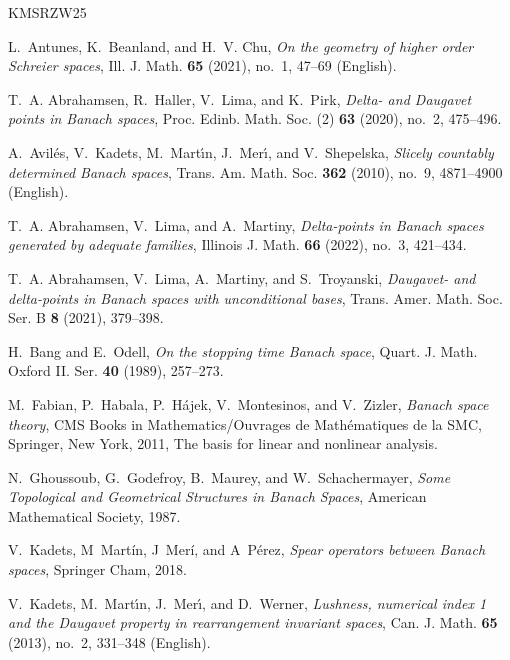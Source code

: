 \documentclass[11pt,a4paper,reqno]{amsart}
\numberwithin{equation}{section}
\newcommand{\1}{\mathbbm{1}}
\theoremstyle{plain}
\theoremstyle{definition}
\begin{document}
\begin{thebibliography}{KMSRZW25}

L.~Antunes, K.~Beanland, and H.~V. Chu, \emph{On the geometry of higher order {Schreier} spaces}, Ill. J. Math. \textbf{65} (2021), no.~1, 47--69 (English).

T.~A. Abrahamsen, R.~Haller, V.~Lima, and K.~Pirk, \emph{Delta- and {D}augavet points in {B}anach spaces}, Proc. Edinb. Math. Soc. (2) \textbf{63} (2020), no.~2, 475--496. 

A.~Avil{\'e}s, V.~Kadets, M.~Mart{\'{\i}}n, J.~Mer{\'{\i}}, and V.~Shepelska, \emph{Slicely countably determined {Banach} spaces}, Trans. Am. Math. Soc. \textbf{362} (2010), no.~9, 4871--4900 (English).

T.~A. Abrahamsen, V.~Lima, and A.~Martiny, \emph{Delta-points in {B}anach spaces generated by adequate families}, Illinois J. Math. \textbf{66} (2022), no.~3, 421--434. 

T.~A. Abrahamsen, V.~Lima, A.~Martiny, and S.~Troyanski, \emph{Daugavet- and delta-points in {B}anach spaces with unconditional bases}, Trans. Amer. Math. Soc. Ser. B \textbf{8} (2021), 379--398. 

H.~Bang and E.~Odell, \emph{{O}n the stopping time {Banach} space}, Quart. J. Math. Oxford II. Ser. \textbf{40} (1989), 257--273.

M.~Fabian, P.~Habala, P.~H{\'a}jek, V.~Montesinos, and V.~Zizler, \emph{Banach space theory}, CMS Books in Mathematics/Ouvrages de Math\'ematiques de la SMC, Springer, New York, 2011, The basis for linear and nonlinear analysis. 

N.~Ghoussoub, G.~Godefroy, B.~Maurey, and W.~Schachermayer, \emph{{S}ome {T}opological and {G}eometrical {S}tructures in {B}anach {S}paces}, {A}merican {M}athematical {S}ociety, 1987.

V.~Kadets, M~Mart\'{i}n, J~Mer\'{i}, and A~P\'{e}rez, \emph{Spear operators between {B}anach spaces}, Springer Cham, 2018.

V.~{Kadets}, M.~{Mart\'{\i}n}, J.~{Mer\'{\i}}, and D.~{Werner}, \emph{{Lushness, numerical index 1 and the Daugavet property in rearrangement invariant spaces}}, {Can. J. Math.} \textbf{65} (2013), no.~2, 331--348 (English).


\end{thebibliography}
\end{document}
